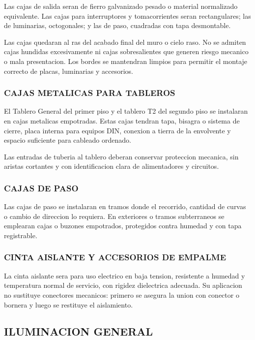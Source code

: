 Las cajas de salida seran de fierro galvanizado pesado o material normalizado equivalente. Las cajas para interruptores y tomacorrientes seran rectangulares; las de luminarias, octogonales; y las de paso, cuadradas con tapa desmontable.

Las cajas quedaran al ras del acabado final del muro o cielo raso. No se admiten cajas hundidas excesivamente ni cajas sobresalientes que generen riesgo mecanico o mala presentacion. Los bordes se mantendran limpios para permitir el montaje correcto de placas, luminarias y accesorios.

\subsubsection{CAJAS METALICAS PARA TABLEROS}

El Tablero General del primer piso y el tablero T2 del segundo piso se instalaran en cajas metalicas empotradas. Estas cajas tendran tapa, bisagra o sistema de cierre, placa interna para equipos DIN, conexion a tierra de la envolvente y espacio suficiente para cableado ordenado.

Las entradas de tuberia al tablero deberan conservar proteccion mecanica, sin aristas cortantes y con identificacion clara de alimentadores y circuitos.

\subsubsection{CAJAS DE PASO}

Las cajas de paso se instalaran en tramos donde el recorrido, cantidad de curvas o cambio de direccion lo requiera. En exteriores o tramos subterraneos se emplearan cajas o buzones empotrados, protegidos contra humedad y con tapa registrable.

\subsubsection{CINTA AISLANTE Y ACCESORIOS DE EMPALME}

La cinta aislante sera para uso electrico en baja tension, resistente a humedad y temperatura normal de servicio, con rigidez dielectrica adecuada. Su aplicacion no sustituye conectores mecanicos: primero se asegura la union con conector o bornera y luego se restituye el aislamiento.

\subsection{ILUMINACION GENERAL}

